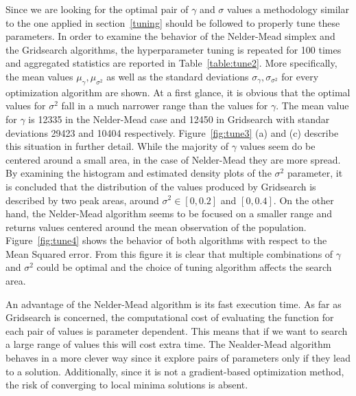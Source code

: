 \documentclass[conference,compsoc]{IEEEtran}
\begin{document}
Since we are looking for the optimal pair of $\gamma$ and $\sigma$ values a methodology similar to the one applied in section~\ref{tuning} should be followed to properly tune these parameters. In order to examine the behavior of the Nelder-Mead simplex and the Gridsearch algorithms, the hyperparameter tuning is repeated for 100 times and aggregated statistics are reported in Table~\ref{table:tune2}. More specifically, the mean values $\mu_\gamma, \mu_{\sigma^2}$ as well as the standard deviations $\sigma_\gamma, \sigma_{\sigma^2}$ for every optimization algorithm are shown. At a first glance, it is obvious that the optimal values for $\sigma^2$ fall in a much narrower range than the values for $\gamma$. The mean value for $\gamma$ is 12335 in the Nelder-Mead case and 12450 in Gridsearch with standar deviations 29423 and 10404 respectively. Figure~\ref{fig:tune3} (a) and (c) describe this situation in further detail. While the majority of $\gamma$ values seem do be centered around a small area, in the case of Nelder-Mead they are more spread. By examining the histogram and estimated density plots of the $\sigma^2$ parameter, it is concluded that the distribution of the values produced by Gridsearch is described by two peak areas, around $\sigma^2 \in [0,0.2]$ and $[0,0.4]$. On the other hand, the Nelder-Mead algorithm seems to be focused on a smaller range and returns values centered around the mean observation of the population. Figure~\ref{fig:tune4} shows the behavior of both algorithms with respect to the Mean Squared error. From this figure it is clear that multiple combinations of $\gamma$ and $\sigma^2$ could be optimal and the choice of tuning algorithm affects the search area.

An advantage of the Nelder-Mead algorithm is its fast execution time. As far as Gridsearch is concerned, the computational cost of evaluating the function for each pair of values is parameter dependent. This means that if we want to search a large range of values this will cost extra time. The Nealder-Mead algorithm behaves in a more clever way since it explore pairs of parameters only if they lead to a solution. Additionally, since it is not a gradient-based optimization method, the risk of converging to local minima solutions is absent.
\end{document}
